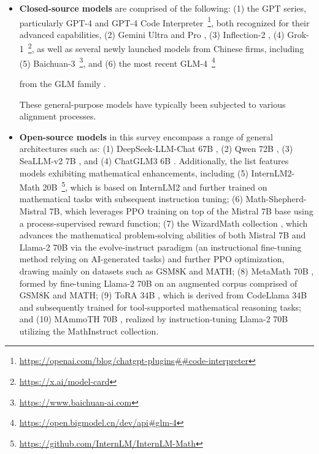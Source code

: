 \begin{itemize}[topsep=0pt]
\begin{itemize}[topsep=0pt]
    \item \textbf{Closed-source models} are comprised of the following: (1) the GPT series, particularly GPT-4 \citep{gpt4} and GPT-4 Code Interpreter~\footnote{\url{https://openai.com/blog/chatgpt-plugins\#\#code-interpreter}}, both recognized for their advanced capabilities, (2) Gemini Ultra and Pro \citep{gemini}, (3) Inflection-2 \citep{inflection-2}, (4) Grok-1~\footnote{\url{https://x.ai/model-card}}, as well as several newly launched models from Chinese firms, including (5) Baichuan-3~\footnote{\url{https://www.baichuan-ai.com}}, and (6) the most recent GLM-4~\footnote{\url{https://open.bigmodel.cn/dev/api\#glm-4}}

    from the GLM family \citep{glm}.

These general-purpose models have typically been subjected to various alignment processes.

\item \textbf{Open-source models} in this survey encompass a range of general architectures such as: (1) DeepSeek-LLM-Chat 67B \citep{deepseek-llm}, (2) Qwen 72B \citep{qwen}, (3) SeaLLM-v2 7B \citep{seallm}, and (4) ChatGLM3 6B \citep{chatglm3}. Additionally, the list features models exhibiting mathematical enhancements, including (5) InternLM2-Math 20B~\footnote{\url{https://github.com/InternLM/InternLM-Math}}, which is based on InternLM2 and further trained on mathematical tasks with subsequent instruction tuning; (6) Math-Shepherd-Mistral 7B, which leverages PPO training \citep{schulman2017proximal} on top of the Mistral 7B \citep{mistral} base using a process-supervised reward function; (7) the WizardMath collection \citep{wizardmath}, which advances the mathematical problem-solving abilities of both Mistral 7B and Llama-2 70B \citep{llama2} via the evolve-instruct paradigm (an instructional fine-tuning method relying on AI-generated tasks) and further PPO optimization, drawing mainly on datasets such as GSM8K and MATH; (8) MetaMath 70B \citep{metamath}, formed by fine-tuning Llama-2 70B on an augmented corpus comprised of GSM8K and MATH; (9) ToRA 34B \cite{tora}, which is derived from CodeLlama 34B and subsequently trained for tool-supported mathematical reasoning tasks; and (10) MAmmoTH 70B \citep{MathInstruct}, realized by instruction-tuning Llama-2 70B utilizing the MathInstruct collection.


\end{itemize}
\end{itemize}
